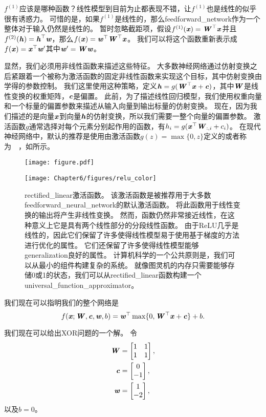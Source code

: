 $f^{(1)}$应该是哪种函数？线性模型到目前为止都表现不错，让$f^{(1)}$也是线性的似乎很有诱惑力。
可惜的是，如果$f^{(1)}$是线性的，那么\gls{feedforward_network}作为一个整体对于输入仍然是线性的。
暂时忽略截距项，假设$f^{(1)}(\boldsymbol{\mathit{x}})= \boldsymbol{\mathit{W}}^\top \boldsymbol{\mathit{x}}$并且$f^{(2)}(\boldsymbol{\mathit{h}})=\boldsymbol{\mathit{h}}^\top \boldsymbol{\mathit{w}}$，那么$f(\boldsymbol{\mathit{x}}) = \boldsymbol{\mathit{w}}^\top\boldsymbol{\mathit{W}}^\top \boldsymbol{\mathit{x}}$。
我们可以将这个函数重新表示成$f(\boldsymbol{\mathit{x}}) = \boldsymbol{\mathit{x}}^\top\boldsymbol{\mathit{w}}'$其中$\boldsymbol{\mathit{w}}' = \boldsymbol{\mathit{W}}\boldsymbol{\mathit{w}}$。


显然，我们必须用非线性函数来描述这些特征。
大多数神经网络通过仿射变换之后紧跟着一个被称为激活函数的固定非线性函数来实现这个目标，其中仿射变换由学得的参数控制。
我们这里使用这种策略，定义$\boldsymbol{\mathit{h}}=g(\boldsymbol{\mathit{W}}^\top \boldsymbol{\mathit{x}}+\boldsymbol{\mathit{c}})$，其中$\boldsymbol{\mathit{W}}$是线性变换的权重矩阵，$\boldsymbol{\mathit{c}}$是偏置。
此前，为了描述线性回归模型，我们使用权重向量和一个标量的偏置参数来描述从输入向量到输出标量的仿射变换。
现在，因为我们描述的是向量$\boldsymbol{\mathit{x}}$到向量$\boldsymbol{\mathit{h}}$的仿射变换，所以我们需要一整个向量的偏置参数。
激活函数$g$通常选择对每个元素分别起作用的函数，有$h_i =g(\boldsymbol{\mathit{x}}^\top \boldsymbol{\mathit{W}}_{:, i} + c_i)$。
在现代神经网络中，默认的推荐是使用由激活函数$g(z)=\max\{0, z\}$定义的或者称为~~\citep{Jarrett-ICCV2009-small,Nair-2010-small,Glorot+al-AI-2011-small}，如所示。
\begin{figure}[!htb]
\ifOpenSource
\centerline{\texttt{[image: figure.pdf]}}
\else
\centerline{\texttt{[image: Chapter6/figures/relu\_color]}}
\fi
\caption{\gls{rectified_linear}激活函数。
该激活函数是被推荐用于大多数\gls{feedforward_neural_network}的默认激活函数。
将此函数用于线性变换的输出将产生非线性变换。 然而，函数仍然非常接近线性，在这种意义上它是具有两个线性部分的分段线性函数。
由于\gls{ReLU}几乎是线性的，因此它们保留了许多使得线性模型易于使用基于梯度的方法进行优化的属性。 它们还保留了许多使得线性模型能够\gls{generalization}良好的属性。 计算机科学的一个公共原则是，我们可以从最小的组件构建复杂的系统。
就像图灵机的内存只需要能够存储0或1的状态，我们可以从\gls{rectified_linear}函数构建一个\gls{universal_function_approximator}。}
\label{fig:chap6_relu_color}
\end{figure}


我们现在可以指明我们的整个网络是
\begin{equation}
f(\boldsymbol{\mathit{x}}; \boldsymbol{\mathit{W}}, \boldsymbol{\mathit{c}}, \boldsymbol{\mathit{w}}, b) = \boldsymbol{\mathit{w}}^\top \max\{ 0, \boldsymbol{\mathit{W}}^\top \boldsymbol{\mathit{x}} + \boldsymbol{\mathit{c}} \} +b.
\end{equation}



我们现在可以给出XOR问题的一个解。
令
\begin{align}
\boldsymbol{\mathit{W}} &= \begin{bmatrix}
1 & 1\\
1 & 1
\end{bmatrix},\\
\boldsymbol{\mathit{c}} &= \begin{bmatrix}
0\\
-1
\end{bmatrix},\\
\boldsymbol{\mathit{w}} &= \begin{bmatrix}
1\\
-2
\end{bmatrix},
\end{align}
以及$b=0$。

